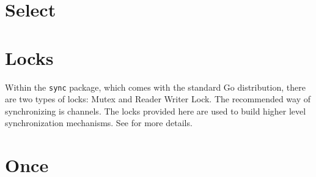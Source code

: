 \documentclass[8pt, twocolumn]{article}
\begin{document}
\section{Select}
\section{Locks}
Within the \verb=sync= package, which comes with the standard Go
distribution, there are two types of locks: Mutex and Reader Writer
Lock. The recommended way of synchronizing is channels. The locks
provided here are used to build higher level synchronization
mechanisms. See \cite{sync} for more details.
\section{Once}


\end{document}
